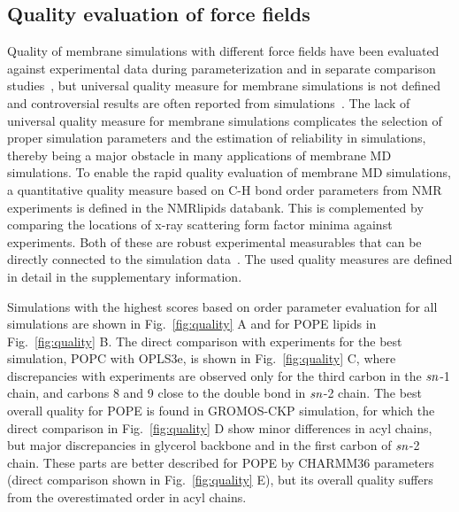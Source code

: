 \documentclass[fleqn,10pt]{wlscirep}
\begin{document}
\subsection{Quality evaluation of force fields}
Quality of membrane simulations with different force fields have been evaluated against experimental data during parameterization and in separate comparison studies~\cite{botan15,ollila16,catte16,pluhackova16,perez17,leonard19}, but universal quality measure for membrane simulations is not defined and controversial results are often reported from simulations~\cite{antila22b}. The lack of universal quality measure for membrane simulations complicates the selection of proper simulation parameters and the estimation of reliability in simulations, thereby being a major obstacle in many applications of membrane MD simulations. To enable the rapid quality evaluation of membrane MD simulations, a quantitative quality measure based on C-H bond order parameters from NMR experiments is defined in the NMRlipids databank. %
This is complemented by comparing the locations of x-ray scattering form factor minima against experiments. 
Both of these are robust experimental measurables that can be directly connected to the simulation data~\cite{ollila16}. The used quality measures are defined in detail in the supplementary information.

Simulations with the highest scores based on order parameter evaluation for all simulations are shown in Fig.~\ref{fig:quality} A and for POPE lipids in Fig.~\ref{fig:quality} B. The direct comparison with experiments for the best simulation, POPC with OPLS3e, is shown in Fig.~\ref{fig:quality} C, where discrepancies with experiments are observed only for the third carbon in the $\it{sn}$-1 chain, and carbons 8 and 9 close to the double bond in $\it{sn}$-2 chain. The best overall quality for POPE is found in GROMOS-CKP simulation, for which the direct comparison in Fig.~\ref{fig:quality} D show minor differences in acyl chains, but major discrepancies in glycerol backbone and in the first carbon of $\it{sn}$-2 chain. These parts are better described for POPE by CHARMM36 parameters (direct comparison shown in Fig.~\ref{fig:quality} E), but its overall quality suffers from the overestimated order in acyl chains. 
\end{document}

